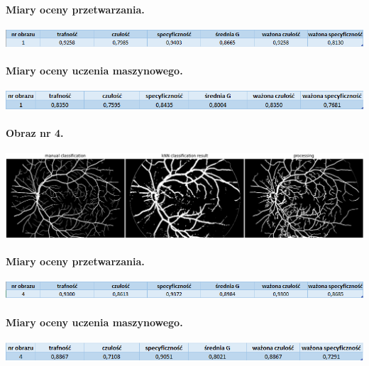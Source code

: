 \documentclass[a4paper, 11pt]{article}
\begin{document}
\paragraph{Miary oceny przetwarzania.}
\begin{center}
	\includegraphics[width=\textwidth]{./processing/data1.png}
\end{center}

\paragraph{Miary oceny uczenia maszynowego.}
\begin{center}
	\includegraphics[width=\textwidth]{./ML/data1.png}
\end{center}

\newpage
\paragraph{Obraz nr 4.}

\begin{center}
	
	\includegraphics[width=\textwidth]{./04_h.png}
	
\end{center}

\paragraph{Miary oceny przetwarzania.}
\begin{center}
	\includegraphics[width=\textwidth]{./processing/data4.png}
\end{center}

\paragraph{Miary oceny uczenia maszynowego.}
\begin{center}
	\includegraphics[width=\textwidth]{./ML/data4.png}
\end{center}
\end{document}
